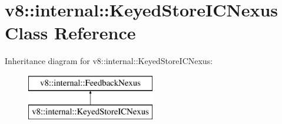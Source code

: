 \hypertarget{classv8_1_1internal_1_1_keyed_store_i_c_nexus}{}\section{v8\+:\+:internal\+:\+:Keyed\+Store\+I\+C\+Nexus Class Reference}
\label{classv8_1_1internal_1_1_keyed_store_i_c_nexus}
Inheritance diagram for v8\+:\+:internal\+:\+:Keyed\+Store\+I\+C\+Nexus\+:\begin{figure}[H]
\begin{center}
\leavevmode
\includegraphics[height=2.000000cm]{classv8_1_1internal_1_1_keyed_store_i_c_nexus}
\end{center}
\end{figure}
